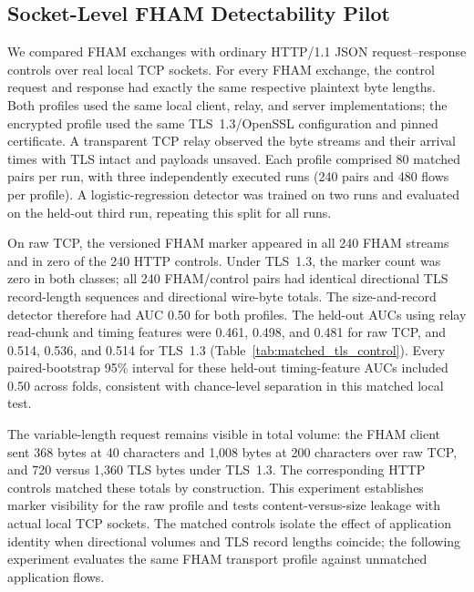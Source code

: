 \documentclass[preprint,12pt]{elsarticle}
\theoremstyle{plain}
\begin{document}
\subsection{Socket-Level FHAM Detectability Pilot}

We compared FHAM exchanges with ordinary HTTP/1.1 JSON request--response
controls over real local TCP sockets. For every FHAM exchange, the control
request and response had exactly the same respective plaintext byte lengths.
Both profiles used the same local client, relay, and server implementations;
the encrypted profile used the same TLS~1.3/OpenSSL configuration and pinned
certificate.
A transparent TCP relay observed the byte streams and their arrival times
with TLS intact and payloads unsaved. Each profile comprised 80 matched
pairs per run, with three independently executed runs (240 pairs and 480
flows per profile). A logistic-regression detector was trained on two runs
and evaluated on the held-out third run, repeating this split for all runs.

On raw TCP, the versioned FHAM marker appeared in all 240 FHAM streams and in
zero of the 240 HTTP controls. Under TLS~1.3, the marker count was zero in both classes;
all 240 FHAM/control pairs had identical directional TLS record-length
sequences and directional wire-byte totals. The size-and-record detector
therefore had AUC 0.50 for both profiles. The held-out AUCs using relay
read-chunk and timing features were 0.461, 0.498, and 0.481 for raw TCP, and
0.514, 0.536, and 0.514 for TLS~1.3 (Table~\ref{tab:matched_tls_control}).
Every paired-bootstrap 95\% interval for these held-out timing-feature AUCs
included 0.50 across folds, consistent with chance-level separation in
this matched local test.

The variable-length request remains visible in total volume: the FHAM client
sent 368 bytes at 40 characters and 1,008 bytes at 200 characters over raw
TCP, and 720 versus 1,360 TLS bytes under TLS~1.3. The corresponding HTTP
controls matched these totals by construction. This experiment establishes
marker visibility for the raw profile and tests content-versus-size leakage
with actual local TCP sockets. The matched controls isolate the effect of
application identity when directional volumes and TLS record lengths coincide;
the following experiment evaluates the same FHAM transport profile against
unmatched application flows.

\begin{table}[H]
\centering
\scriptsize
\setlength{\tabcolsep}{3pt}
\caption{Socket-level FHAM marker and held-out detectability results with matched HTTP controls.}
\label{tab:matched_tls_control}

\end{table}
\end{document}
